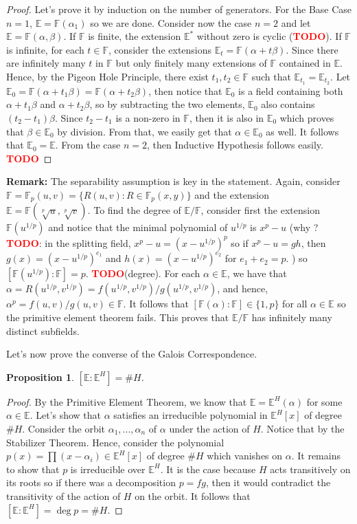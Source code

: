 \documentclass{article}
\newtheorem*{proposition}{Proposition}
\newcommand{\F}{\mathbb{F}}
\newcommand{\E}{\mathbb{E}}
\newcommand{\td}{\textcolor{red}{\textbf{TODO}}}
\newenvironment{remark}{\noindent\textbf{Remark:}}{}
\begin{document}
\begin{proof}
    Let's prove it by induction on the number of generators. For the Base Case $n = 1$, $\E = \F(\alpha_1)$ so we are done. Consider now the case $n= 2$ and let $\E = \F(\alpha, \beta)$. If $\F$ is finite, the extension $\E^*$ without zero is cyclic (\td). If $\F$ is infinite, for each $t \in \F$, consider the extensions $\E_t = \F(\alpha + t \beta)$. Since there are infinitely many $t$ in $\F$ but only finitely many extensions of $\F$ contained in $\E$. Hence, by the Pigeon Hole Principle, there exist $t_1, t_2 \in \F$ such that $\E_{t_1} = \E_{t_2}$. Let $\E_0 = \F(\alpha + t_1 \beta) = \F(\alpha + t_2 \beta)$, then notice that $\E_0$ is a field containing both $\alpha + t_1 \beta$ and $\alpha + t_2 \beta$, so by subtracting the two elements, $\E_0$ also contains $(t_2 - t_1)\beta$. Since $t_2 - t_1$ is a non-zero in $\F$, then it is also in $\E_0$ which proves that $\beta \in \E_0$ by division. From that, we easily get that $\alpha \in \E_0$ as well. It follows that $\E_0 = \E$. From the case $n = 2$, then Inductive Hypothesis follows easily. \td
\end{proof}

\begin{remark}
    The separability assumption is key in the statement. Again, consider $\F = \F_p(u,v) = \{R(u,v) : R \in \F_p(x,y)\}$ and the extension $\E = \F(\sqrt[p]{u}, \sqrt[p]{v})$. To find the degree of $\E / \F$, consider first the extension $\F(u^{1/p})$ and notice that the minimal polynomial of $u^{1/p}$ is $x^p - u$ (why ? \td : in the splitting field, $x^p - u = (x - u^{1/p})^p$ so if $x^p - u = g h$, then $g(x) = (x - u^{1/p})^{e_1}$ and $h(x) = (x - u^{1/p})^{e_2}$ for $e_1 + e_2 = p$. ) so $[\F(u^{1/p}) : \F] = p$. \td (degree). For each $\alpha \in \E$, we have that $\alpha = R(u^{1/p}, v^{1/p}) = f(u^{1/p}, v^{1/p}) / g(u^{1/p}, v^{1/p})$, and hence, $\alpha^p = f(u,v)/g(u,v) \in \F$. It follows that $[\F(\alpha) : \F] \in \{1, p\}$ for all $\alpha \in \E$ so the primitive element theorem fails. This proves that $\E / \F$ has infinitely many distinct subfields. 
\end{remark}

Let's now prove the converse of the Galois Correspondence. 

\begin{proposition}
    $[\E : \E^H] = \# H$.
\end{proposition}

\begin{proof}
    By the Primitive Element Theorem, we know that $\E = \E^H(\alpha)$ for some $\alpha \in \E$. Let's show that $\alpha$ satisfies an irreducible polynomial in $\E^H[x]$ of degree $\# H$. Consider the orbit $\alpha_1, ..., \alpha_n$ of $\alpha$ under the action of $H$. Notice that by the Stabilizer Theorem. Hence, consider the polynomial $p(x) = \prod(x - \alpha_i) \in \E^H[x]$ of degree $\# H$ which vanishes on $\alpha$. It remains to show that $p$ is irreducible over $\E^H$. It is the case because $H$ acts transitively on its roots so if there was a decomposition $p = fg$, then it would contradict the transitivity of the action of $H$ on the orbit. It follows that $[\E : \E^H] = \deg p = \# H$.  
\end{proof}
\end{document}
